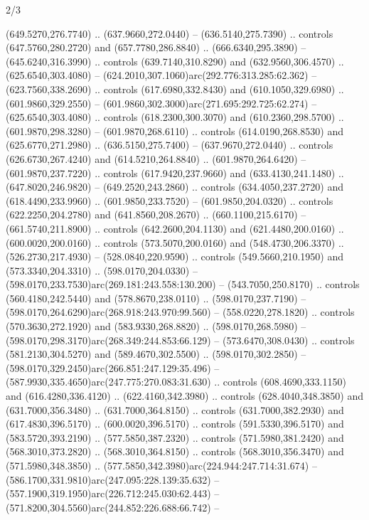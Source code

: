 \begin{flagdescription}{2/3}
\begin{scope}[xshift=0.5\flaglength,yshift=0.5\flagwidth,scale=\flagwidth/638.38]
\begin{scope}[y=0.80pt, x=0.80pt, yscale=-1,shift={(-600,-400)}]
\begin{scope}[shift={(-0.02,2.173)}]
  (649.5270,276.7740) .. (637.9660,272.0440) -- (636.5140,275.7390) .. controls
  (647.5760,280.2720) and (657.7780,286.8840) .. (666.6340,295.3890) --
  (645.6240,316.3990) .. controls (639.7140,310.8290) and (632.9560,306.4570) ..
  (625.6540,303.4080) -- (624.2010,307.1060)arc(292.776:313.285:62.362) --
  (623.7560,338.2690) .. controls (617.6980,332.8430) and (610.1050,329.6980) ..
  (601.9860,329.2550) -- (601.9860,302.3000)arc(271.695:292.725:62.274) --
  (625.6540,303.4080) .. controls (618.2300,300.3070) and (610.2360,298.5700) ..
  (601.9870,298.3280) -- (601.9870,268.6110) .. controls (614.0190,268.8530) and
  (625.6770,271.2980) .. (636.5150,275.7400) -- (637.9670,272.0440) .. controls
  (626.6730,267.4240) and (614.5210,264.8840) .. (601.9870,264.6420) --
  (601.9870,237.7220) .. controls (617.9420,237.9660) and (633.4130,241.1480) ..
  (647.8020,246.9820) -- (649.2520,243.2860) .. controls (634.4050,237.2720) and
  (618.4490,233.9960) .. (601.9850,233.7520) -- (601.9850,204.0320) .. controls
  (622.2250,204.2780) and (641.8560,208.2670) .. (660.1100,215.6170) --
  (661.5740,211.8900) .. controls (642.2600,204.1130) and (621.4480,200.0160) ..
  (600.0020,200.0160) .. controls (573.5070,200.0160) and (548.4730,206.3370) ..
  (526.2730,217.4930) -- (528.0840,220.9590) .. controls (549.5660,210.1950) and
  (573.3340,204.3310) .. (598.0170,204.0330) --
  (598.0170,233.7530)arc(269.181:243.558:130.200) -- (543.7050,250.8170) ..
  controls (560.4180,242.5440) and (578.8670,238.0110) .. (598.0170,237.7190) --
  (598.0170,264.6290)arc(268.918:243.970:99.560) -- (558.0220,278.1820) ..
  controls (570.3630,272.1920) and (583.9330,268.8820) .. (598.0170,268.5980) --
  (598.0170,298.3170)arc(268.349:244.853:66.129) -- (573.6470,308.0430) ..
  controls (581.2130,304.5270) and (589.4670,302.5500) .. (598.0170,302.2850) --
  (598.0170,329.2450)arc(266.851:247.129:35.496) --
  (587.9930,335.4650)arc(247.775:270.083:31.630) .. controls (608.4690,333.1150)
  and (616.4280,336.4120) .. (622.4160,342.3980) .. controls (628.4040,348.3850)
  and (631.7000,356.3480) .. (631.7000,364.8150) .. controls (631.7000,382.2930)
  and (617.4830,396.5170) .. (600.0020,396.5170) .. controls (591.5330,396.5170)
  and (583.5720,393.2190) .. (577.5850,387.2320) .. controls (571.5980,381.2420)
  and (568.3010,373.2820) .. (568.3010,364.8150) .. controls (568.3010,356.3470)
  and (571.5980,348.3850) .. (577.5850,342.3980)arc(224.944:247.714:31.674) --
  (586.1700,331.9810)arc(247.095:228.139:35.632) --
  (557.1900,319.1950)arc(226.712:245.030:62.443) --
  (571.8200,304.5560)arc(244.852:226.688:66.742) --

\end{scope}
\end{scope}
\end{scope}
\end{flagdescription}
